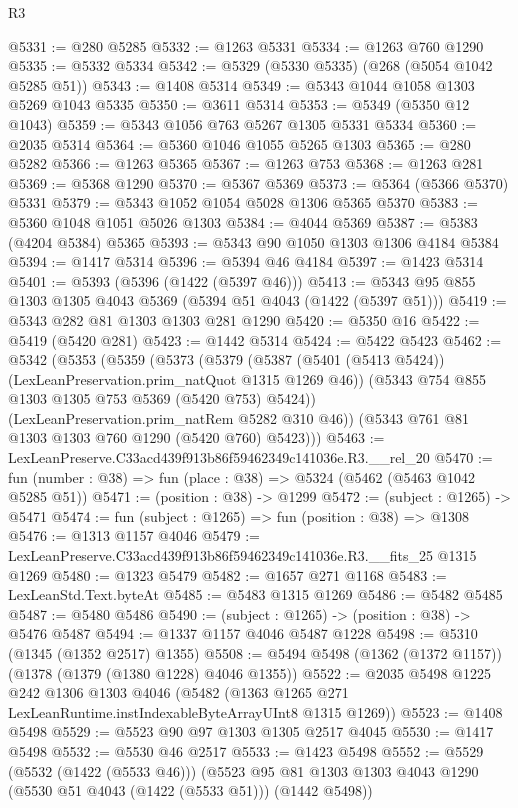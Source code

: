 \begin{lexlean}{R3}
\begin{coremodule}
@5331 := @280 @5285
@5332 := @1263 @5331
@5334 := @1263 @760 @1290
@5335 := @5332 @5334
@5342 := @5329 (@5330 @5335) (@268 (@5054 @1042 @5285 @51))
@5343 := @1408 @5314
@5349 := @5343 @1044 @1058 @1303 @5269 @1043 @5335
@5350 := @3611 @5314
@5353 := @5349 (@5350 @12 @1043)
@5359 := @5343 @1056 @763 @5267 @1305 @5331 @5334
@5360 := @2035 @5314
@5364 := @5360 @1046 @1055 @5265 @1303
@5365 := @280 @5282
@5366 := @1263 @5365
@5367 := @1263 @753
@5368 := @1263 @281
@5369 := @5368 @1290
@5370 := @5367 @5369
@5373 := @5364 (@5366 @5370) @5331
@5379 := @5343 @1052 @1054 @5028 @1306 @5365 @5370
@5383 := @5360 @1048 @1051 @5026 @1303
@5384 := @4044 @5369
@5387 := @5383 (@4204 @5384) @5365
@5393 := @5343 @90 @1050 @1303 @1306 @4184 @5384
@5394 := @1417 @5314
@5396 := @5394 @46 @4184
@5397 := @1423 @5314
@5401 := @5393 (@5396 (@1422 (@5397 @46)))
@5413 := @5343 @95 @855 @1303 @1305 @4043 @5369 (@5394 @51 @4043 (@1422 (@5397 @51)))
@5419 := @5343 @282 @81 @1303 @1303 @281 @1290
@5420 := @5350 @16
@5422 := @5419 (@5420 @281)
@5423 := @1442 @5314
@5424 := @5422 @5423
@5462 := @5342
    (@5353
      (@5359
        (@5373
          (@5379
            (@5387 (@5401 (@5413 @5424)) (LexLeanPreservation.prim_natQuot @1315 @1269 @46))
            (@5343 @754 @855 @1303 @1305 @753 @5369 (@5420 @753) @5424))
          (LexLeanPreservation.prim_natRem @5282 @310 @46))
        (@5343 @761 @81 @1303 @1303 @760 @1290 (@5420 @760) @5423)))
@5463 := LexLeanPreserve.C33acd439f913b86f59462349c141036e.R3.__rel_20
@5470 := fun (number : @38) => fun (place : @38) => @5324 (@5462 (@5463 @1042 @5285 @51))
@5471 := (position : @38) -> @1299
@5472 := (subject : @1265) -> @5471
@5474 := fun (subject : @1265) => fun (position : @38) => @1308
@5476 := @1313 @1157 @4046
@5479 := LexLeanPreserve.C33acd439f913b86f59462349c141036e.R3.__fits_25 @1315 @1269
@5480 := @1323 @5479
@5482 := @1657 @271 @1168
@5483 := LexLeanStd.Text.byteAt
@5485 := @5483 @1315 @1269
@5486 := @5482 @5485
@5487 := @5480 @5486
@5490 := (subject : @1265) -> (position : @38) -> @5476 @5487
@5494 := @1337 @1157 @4046 @5487 @1228
@5498 := @5310 (@1345 (@1352 @2517) @1355)
@5508 := @5494 @5498 (@1362 (@1372 @1157)) (@1378 (@1379 (@1380 @1228) @4046 @1355))
@5522 := @2035
    @5498
    @1225
    @242
    @1306
    @1303
    @4046
    (@5482 (@1363 @1265 @271 LexLeanRuntime.instIndexableByteArrayUInt8 @1315 @1269))
@5523 := @1408 @5498
@5529 := @5523 @90 @97 @1303 @1305 @2517 @4045
@5530 := @1417 @5498
@5532 := @5530 @46 @2517
@5533 := @1423 @5498
@5552 := @5529
    (@5532 (@1422 (@5533 @46)))
    (@5523 @95 @81 @1303 @1303 @4043 @1290 (@5530 @51 @4043 (@1422 (@5533 @51))) (@1442 @5498))

\end{coremodule}
\end{lexlean}
